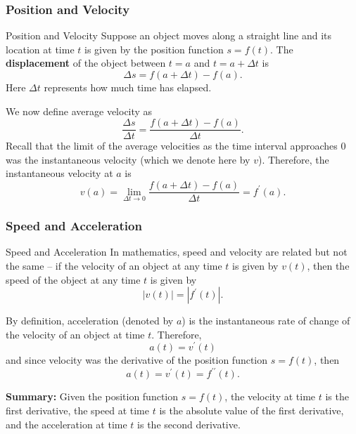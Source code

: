 \documentclass[cal1spr16Lectures.tex]{subfiles}
\begin{document}
\subsubsection{Position and Velocity}

\begin{frame}{\small Position and Velocity}
Suppose an object moves along a straight line and its location at time $t$ is given by the position function $s=f(t)$.  The {\bf displacement} of the object between $t=a$ and $t=a+\Delta t$ is 
\[\Delta s = f(a+\Delta t)-f(a).\]
Here $\Delta t$ represents how much time has elapsed.
\end{frame}

\begin{frame}{}
We now define average velocity as 
\[\frac{\Delta s}{\Delta t}=\frac{f(a+\Delta t)-f(a)}{\Delta t}.\]
Recall that the limit of the average velocities as the time interval approaches 0 was the instantaneous velocity (which we denote here by $v$).  Therefore, the instantaneous velocity at $a$ is 
\[v(a)=\lim_{\Delta t \to 0} \frac{f(a+\Delta t)-f(a)}{\Delta t} = f^{\prime}(a).\]
\end{frame}

\subsubsection{Speed and Acceleration}

\begin{frame}{\small Speed and Acceleration}
In mathematics, speed and velocity are related but not the same -- if the \alert{velocity} of an object at any time $t$ is given by $v(t)$, then the \alert{speed} of the object at any time $t$ is given by 
\[|v(t)|=|f^{\prime}(t)|.\]
\end{frame}

\begin{frame}[allowframebreaks]{}
By definition, acceleration (denoted by $a$) is the instantaneous rate of change of the velocity of an object at time $t$.  Therefore,
\[a(t)=v^{\prime}(t)\]
and since velocity was the derivative of the position function $s=f(t)$, then 
\[a(t)=v^{\prime}(t)=f^{\prime\prime}(t).\]

\framebreak
{\bf Summary:}  Given the position function $s=f(t)$, the velocity at time $t$ is the first derivative, the speed at time $t$ is the absolute value of the first derivative, and the acceleration at time $t$ is the second derivative.
\end{frame}
\end{document}
